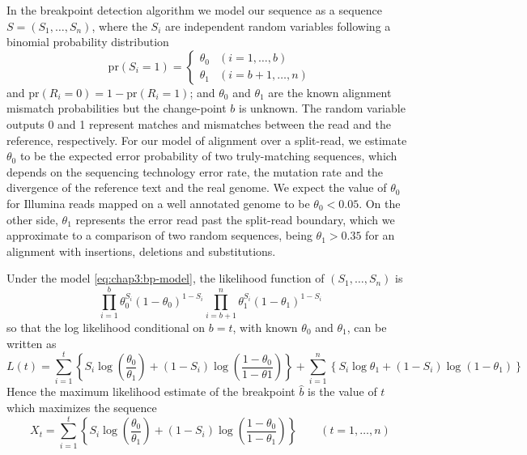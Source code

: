 In the breakpoint detection algorithm we model our sequence as a
sequence $S = (S_1,\ldots,S_n)$, where the $S_i$ are independent
random variables following a binomial probability distribution
\begin{equation}
  \label{eq:chap3:bp-model}
  \mbox{pr}(S_i = 1) =
  \begin{cases}
    \theta_0 & (i=1,\ldots,b) \\
    \theta_1 & (i=b+1,\ldots,n)
  \end{cases}
\end{equation}
and $\mbox{pr}(R_i=0) = 1-\mbox{pr}(R_i=1)$; and $\theta_0$ and
$\theta_1$ are the known alignment mismatch probabilities but the
change-point $b$ is unknown. The random variable outputs 0 and 1
represent matches and mismatches between the read and the reference,
respectively. For our model of alignment over a split-read, we
estimate $\theta_0$ to be the expected error probability of two
truly-matching sequences, which depends on the sequencing technology
error rate, the mutation rate and the divergence of the reference text
and the real genome. We expect the value of $\theta_0$ for Illumina
reads mapped on a well annotated genome to be $\theta_0 < 0.05$. On
the other side, $\theta_1$ represents the error read past the
split-read boundary, which we approximate to a comparison of two
random sequences, being $\theta_1 > 0.35$ for an alignment with
insertions, deletions and substitutions.

Under the model \eqref{eq:chap3:bp-model}, the likelihood function of
$(S_1,\ldots,S_n)$ is
\begin{equation}
  \label{eq:chap3:bp-likelihood}
  \prod_{i=1}^b \theta_0^{S_i}(1-\theta_0)^{1-S_i} \prod_{i=b+1}^n
  \theta_1^{S_i}(1-\theta_1)^{1-S_i}
\end{equation}
so that the log likelihood conditional on $b=t$, with known $\theta_0$
and $\theta_1$, can be written as
\begin{equation}
  \label{eq:chap3:bp-loglikelihood}
  L(t) =
  \sum_{i=1}^t \left\{ S_i\log\left(\frac{\theta_0}{\theta_1}\right) +
  (1-S_i)\log\left(\frac{1-\theta_0}{1-\theta1}\right) \right\}  + 
  \sum_{i=1}^n \left\{ S_i\log{\theta_1} + (1-S_i)\log (1-\theta_1)
  \right\}
\end{equation}
Hence the maximum likelihood estimate of the breakpoint $\hat{b}$ is
the value of $t$ which maximizes the sequence
\begin{equation}
  \label{eq:chap3:max-likelihood}
  X_t =
  \sum_{i=1}^{t}\left\{S_i\log\left(\frac{\theta_0}{\theta_1}\right) +
  (1-S_i)\log\left(\frac{1-\theta_0}{1-\theta_1}\right)\right\} \qquad
(t=1,\ldots,n) 
\end{equation}

